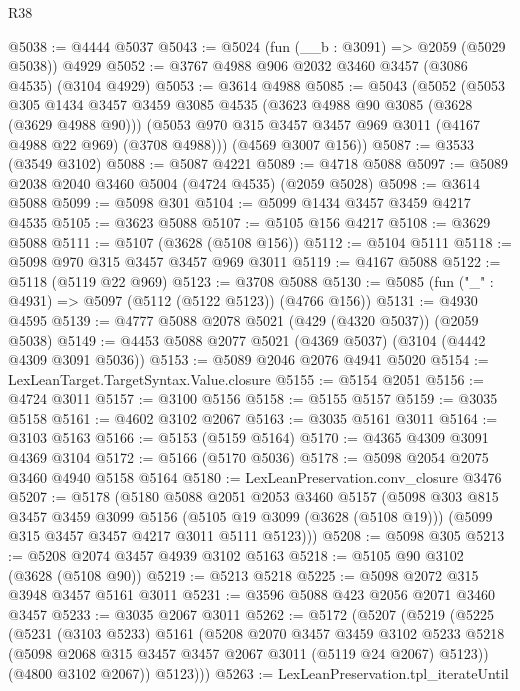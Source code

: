 \begin{lexlean}{R38}
\begin{coremodule}
@5038 := @4444 @5037
@5043 := @5024 (fun (__b : @3091) => @2059 (@5029 @5038)) @4929
@5052 := @3767 @4988 @906 @2032 @3460 @3457 (@3086 @4535) (@3104 @4929)
@5053 := @3614 @4988
@5085 := @5043
    (@5052
      (@5053
        @305
        @1434
        @3457
        @3459
        @3085
        @4535
        (@3623 @4988 @90 @3085 (@3628 (@3629 @4988 @90)))
        (@5053 @970 @315 @3457 @3457 @969 @3011 (@4167 @4988 @22 @969) (@3708 @4988)))
      (@4569 @3007 @156))
@5087 := @3533 (@3549 @3102)
@5088 := @5087 @4221
@5089 := @4718 @5088
@5097 := @5089 @2038 @2040 @3460 @5004 (@4724 @4535) (@2059 @5028)
@5098 := @3614 @5088
@5099 := @5098 @301
@5104 := @5099 @1434 @3457 @3459 @4217 @4535
@5105 := @3623 @5088
@5107 := @5105 @156 @4217
@5108 := @3629 @5088
@5111 := @5107 (@3628 (@5108 @156))
@5112 := @5104 @5111
@5118 := @5098 @970 @315 @3457 @3457 @969 @3011
@5119 := @4167 @5088
@5122 := @5118 (@5119 @22 @969)
@5123 := @3708 @5088
@5130 := @5085 (fun ("_" : @4931) => @5097 (@5112 (@5122 @5123)) (@4766 @156))
@5131 := @4930 @4595
@5139 := @4777 @5088 @2078 @5021 (@429 (@4320 @5037)) (@2059 @5038)
@5149 := @4453 @5088 @2077 @5021 (@4369 @5037) (@3104 (@4442 @4309 @3091 @5036))
@5153 := @5089 @2046 @2076 @4941 @5020
@5154 := LexLeanTarget.TargetSyntax.Value.closure
@5155 := @5154 @2051
@5156 := @4724 @3011
@5157 := @3100 @5156
@5158 := @5155 @5157
@5159 := @3035 @5158
@5161 := @4602 @3102 @2067
@5163 := @3035 @5161 @3011
@5164 := @3103 @5163
@5166 := @5153 (@5159 @5164)
@5170 := @4365 @4309 @3091 @4369 @3104
@5172 := @5166 (@5170 @5036)
@5178 := @5098 @2054 @2075 @3460 @4940 @5158 @5164
@5180 := LexLeanPreservation.conv_closure @3476
@5207 := @5178
    (@5180
      @5088
      @2051
      @2053
      @3460
      @5157
      (@5098
        @303
        @815
        @3457
        @3459
        @3099
        @5156
        (@5105 @19 @3099 (@3628 (@5108 @19)))
        (@5099 @315 @3457 @3457 @4217 @3011 @5111 @5123)))
@5208 := @5098 @305
@5213 := @5208 @2074 @3457 @4939 @3102 @5163
@5218 := @5105 @90 @3102 (@3628 (@5108 @90))
@5219 := @5213 @5218
@5225 := @5098 @2072 @315 @3948 @3457 @5161 @3011
@5231 := @3596 @5088 @423 @2056 @2071 @3460 @3457
@5233 := @3035 @2067 @3011
@5262 := @5172
    (@5207
      (@5219
        (@5225
          (@5231
            (@3103 @5233)
            @5161
            (@5208
              @2070
              @3457
              @3459
              @3102
              @5233
              @5218
              (@5098 @2068 @315 @3457 @3457 @2067 @3011 (@5119 @24 @2067) @5123))
            (@4800 @3102 @2067))
          @5123)))
@5263 := LexLeanPreservation.tpl_iterateUntil

\end{coremodule}
\end{lexlean}
